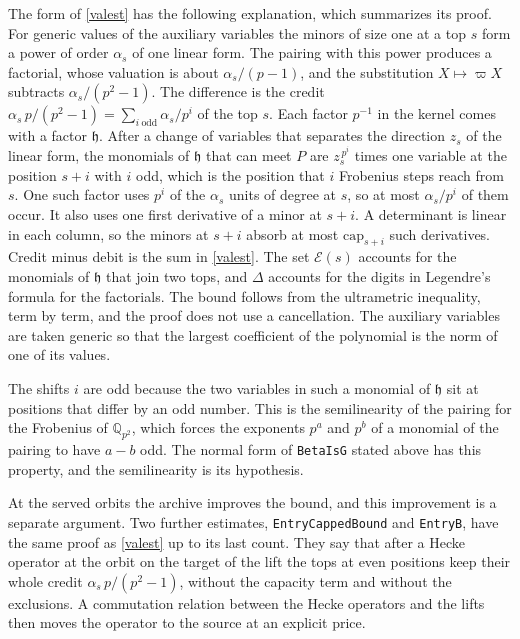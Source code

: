 \documentclass[11pt,letterpaper]{article}
\numberwithin{equation}{section}
\begin{document}
The form of \eqref{valest} has the following explanation, which summarizes its proof. For generic values of the auxiliary variables the minors of size one at a top $s$ form a power of order $\alpha_s$ of one linear form. The pairing with this power produces a factorial, whose valuation is about $\alpha_s/(p-1)$, and the substitution $X\mapsto\varpi X$ subtracts $\alpha_s/(p^2-1)$. The difference is the credit $\alpha_s\,p/(p^2-1)=\sum_{i\ \mathrm{odd}}\alpha_s/p^i$ of the top $s$. Each factor $p^{-1}$ in the kernel comes with a factor $\mathfrak h$. After a change of variables that separates the direction $z_s$ of the linear form, the monomials of $\mathfrak h$ that can meet $P$ are $z_s^{\,p^i}$ times one variable at the position $s+i$ with $i$ odd, which is the position that $i$ Frobenius steps reach from $s$. One such factor uses $p^i$ of the $\alpha_s$ units of degree at $s$, so at most $\alpha_s/p^i$ of them occur. It also uses one first derivative of a minor at $s+i$. A determinant is linear in each column, so the minors at $s+i$ absorb at most $\mathrm{cap}_{s+i}$ such derivatives. Credit minus debit is the sum in \eqref{valest}. The set $\mathcal E(s)$ accounts for the monomials of $\mathfrak h$ that join two tops, and $\Delta$ accounts for the digits in Legendre's formula for the factorials. The bound follows from the ultrametric inequality, term by term, and the proof does not use a cancellation. The auxiliary variables are taken generic so that the largest coefficient of the polynomial is the norm of one of its values.

The shifts $i$ are odd because the two variables in such a monomial of $\mathfrak h$ sit at positions that differ by an odd number. This is the semilinearity of the pairing for the Frobenius of $\mathbb Q_{p^2}$, which forces the exponents $p^a$ and $p^b$ of a monomial of the pairing to have $a-b$ odd. The normal form of \texttt{BetaIsG} stated above has this property, and the semilinearity is its hypothesis.

At the served orbits the archive improves the bound, and this improvement is a separate argument. Two further estimates, \texttt{EntryCappedBound} and \texttt{EntryB}, have the same proof as \eqref{valest} up to its last count. They say that after a Hecke operator at the orbit on the target of the lift the tops at even positions keep their whole credit $\alpha_s\,p/(p^2-1)$, without the capacity term and without the exclusions. A commutation relation between the Hecke operators and the lifts then moves the operator to the source at an explicit price.
\end{document}
